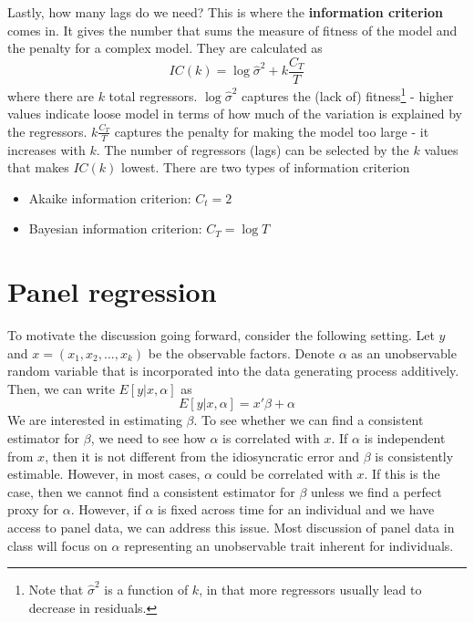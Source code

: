 \documentclass[12pt]{article}
\theoremstyle{definition}
\theoremstyle{property}
\theoremstyle{assumption}
\theoremstyle{example}
\theoremstyle{comment}
\begin{document}
\par
Lastly, how many lags do we need? This is where the \textbf{information criterion} comes in. It gives the number that sums the measure of fitness of the model and the penalty for a complex model. They are calculated as
\[
IC(k) = \log\hat{\sigma}^2+k\frac{C_T}{T}
\]
where there are $k$ total regressors. $\log\hat{\sigma}^2$ captures the (lack of) fitness\footnote{Note that $\hat{\sigma}^2$ is a function of $k$, in that more regressors usually lead to decrease in residuals. } - higher values indicate loose model in terms of how much of the variation is explained by the regressors. $k\frac{C_T}{T}$ captures the penalty for making the model too large - it increases with $k$. The number of regressors (lags) can be selected by the $k$ values that makes $IC(k)$ lowest. There are two types of information criterion
\begin{itemize}
\item Akaike information criterion: $C_t= 2$
\item Bayesian information criterion: $C_T=\log{T}$
\end{itemize}

\section{Panel regression}
To motivate the discussion going forward, consider the following setting. Let $y$ and $x=(x_1,x_2,...,x_k)$ be the observable factors. Denote $\alpha$ as an unobservable random variable that is incorporated into the data generating process additively. Then, we can write $E[y|x,\alpha]$ as 
\[
E[y|x,\alpha] = x'\beta+\alpha
\]
We are interested in estimating $\beta$. To see whether we can find a consistent estimator for $\beta$, we need to see how $\alpha$ is correlated with $x$. If $\alpha$ is independent from $x$, then it is not different from the idiosyncratic error and $\beta$ is consistently estimable. However, in most cases, $\alpha$ could be correlated with $x$. If this is the case, then we cannot find a consistent estimator for $\beta$ unless we find a perfect proxy for $\alpha$. However, if $\alpha$ is fixed across time for an individual and we have access to panel data, we can address this issue. Most discussion of panel data in class will focus on $\alpha$ representing an unobservable trait inherent for individuals.   \par
\end{document}
